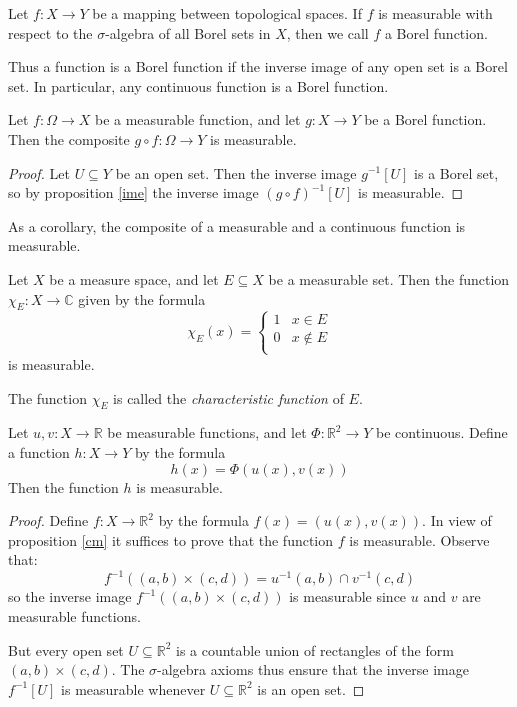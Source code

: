 \begin{definition}
Let $f\colon X\rightarrow Y$ be a mapping between topological spaces.  If $f$ is measurable with respect to the $\sigma$-algebra of all Borel sets in $X$, then we call $f$ a Borel function.
\end{definition}

Thus a function is a Borel function if the inverse image of any open set is a Borel set.  In particular, any continuous function is a Borel function.

\begin{proposition} \label{cm}
Let $f\colon \Omega \rightarrow X$ be a measurable function, and let $g\colon X\rightarrow Y$ be a Borel function.  Then the composite $g\circ f \colon \Omega \rightarrow Y$ is measurable.
\end{proposition}

\begin{proof}
Let $U\subseteq Y$ be an open set.  Then the inverse image $g^{-1}[U]$ is a Borel set, so by proposition \ref{ime} the inverse image $(g\circ f)^{-1}[U]$ is measurable.
\end{proof}

As a corollary, the composite of a measurable and a continuous function is measurable.

\begin{example} \label{char}
  Let $X$ be a measure space, and let $E\subseteq X$ be a measurable set.  Then the function
  $\chi_E \colon X\rightarrow {\mathbb C}$ given by the formula
  $$\chi_E (x) = \left\{ \begin{array}{ll} 1 & x\in E \\
  0 & x\not\in E \\
  \end{array} \right.$$
is measurable.
\end{example}

The function $\chi_E$ is called the {\em characteristic function} of $E$.


\begin{proposition} \label{2dm}
Let $u,v\colon X\rightarrow {\mathbb R}$ be measurable functions, and let $\Phi \colon {\mathbb R}^2 \rightarrow Y$ be continuous.  Define a function $h\colon X\rightarrow Y$ by the formula
$$h(x) = \Phi (u(x),v(x))$$
Then the function $h$ is measurable.
\end{proposition}

\begin{proof}
Define $f\colon X\rightarrow {\mathbb R}^2$ by the formula $f(x) = (u(x),v(x))$.  In view of proposition \ref{cm} it suffices to prove that the function $f$ is measurable.  Observe that:
$$f^{-1}((a,b)\times (c,d)) = u^{-1}(a,b)\cap v^{-1}(c,d)$$
so the inverse image $f^{-1}((a,b)\times (c,d))$ is measurable since $u$ and $v$ are measurable functions.

But every open set $U\subseteq {\mathbb R}^2$ is a countable union of rectangles of the form $(a,b)\times (c,d)$.  The $\sigma$-algebra axioms thus ensure that the inverse image $f^{-1}[U]$ is measurable whenever $U\subseteq {\mathbb R}^2$ is an open set.
\end{proof}

